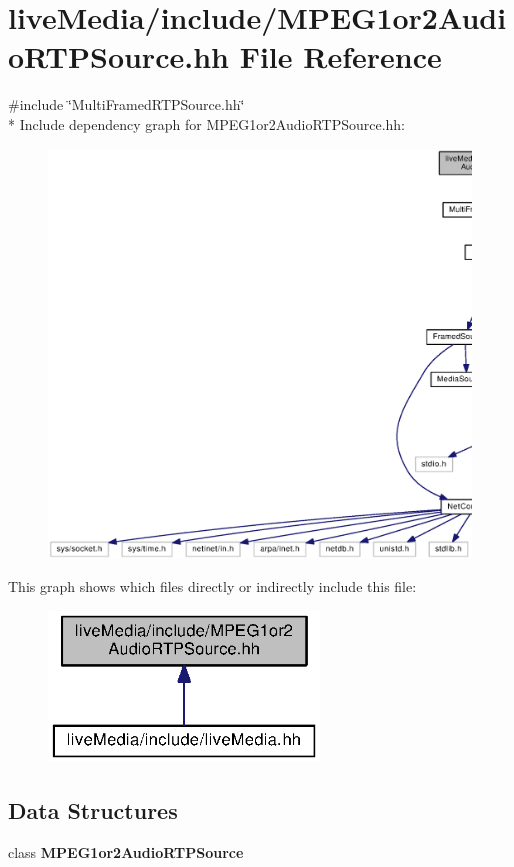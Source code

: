 \section{live\+Media/include/\+M\+P\+E\+G1or2\+Audio\+R\+T\+P\+Source.hh File Reference}
\label{MPEG1or2AudioRTPSource_8hh}
{\ttfamily \#include \char`\"{}Multi\+Framed\+R\+T\+P\+Source.\+hh\char`\"{}}\\*
Include dependency graph for M\+P\+E\+G1or2\+Audio\+R\+T\+P\+Source.\+hh\+:
\nopagebreak
\begin{figure}[H]
\begin{center}
\leavevmode
\includegraphics[width=350pt]{MPEG1or2AudioRTPSource_8hh__incl}
\end{center}
\end{figure}
This graph shows which files directly or indirectly include this file\+:
\nopagebreak
\begin{figure}[H]
\begin{center}
\leavevmode
\includegraphics[width=204pt]{MPEG1or2AudioRTPSource_8hh__dep__incl}
\end{center}
\end{figure}
\subsection*{Data Structures}
\begin{DoxyCompactItemize}
\item 
class {\bf M\+P\+E\+G1or2\+Audio\+R\+T\+P\+Source}
\end{DoxyCompactItemize}
